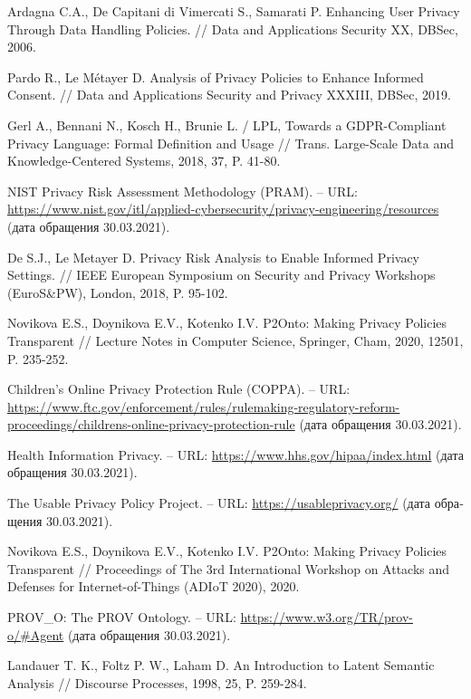 \documentclass[../main]{subfiles}
\begin{document}
\begin{english}
\begin{biblenum}
     Ardagna C.A., De Capitani di Vimercati S., Samarati P. Enhancing User Privacy Through Data Handling Policies. // Data and Applications Security XX, DBSec, 2006. 

     Pardo R., Le Métayer D. Analysis of Privacy Policies to Enhance Informed Consent. // Data and Applications Security and Privacy XXXIII, DBSec, 2019. 

     Gerl A., Bennani N., Kosch H., Brunie L. / LPL, Towards a GDPR-Compliant Privacy Language: Formal Definition and Usage // Trans. Large-Scale Data and Knowledge-Centered Systems, 2018, 37, P. 41-80. 

     NIST Privacy Risk Assessment Methodology (PRAM). -- URL: \url{https://www.nist.gov/itl/applied-cybersecurity/privacy-engineering/resources} (\textrussian{дата обращения} 30.03.2021).

     De S.J., Le Metayer D.  Privacy Risk Analysis to Enable Informed Privacy Settings. // IEEE European Symposium on Security and Privacy Workshops (EuroS\&PW), London, 2018, P. 95-102. 

     Novikova E.S., Doynikova E.V., Kotenko I.V. P2Onto: Making Privacy Policies Transparent // Lecture Notes in Computer Science, Springer, Cham, 2020, 12501, P. 235-252.

     Children's Online Privacy Protection Rule (COPPA). -- URL: \url{https://www.ftc.gov/enforcement/rules/rulemaking-regulatory-reform-proceedings/childrens-online-privacy-protection-rule} (\textrussian{дата обращения} 30.03.2021). 

     Health Information Privacy. -- URL: \url{https://www.hhs.gov/hipaa/index.html} (\textrussian{дата обращения} 30.03.2021).

     The Usable Privacy Policy Project. -- URL: \url{https://usableprivacy.org/} (\textrussian{дата обращения} 30.03.2021).

     Novikova E.S., Doynikova E.V., Kotenko I.V. P2Onto: Making Privacy Policies Transparent // Proceedings of The 3rd International Workshop on Attacks and Defenses for Internet-of-Things (ADIoT 2020), 2020.

     PROV\_O: The PROV Ontology. -- URL: \url{https://www.w3.org/TR/prov-o/#Agent} (\textrussian{дата обращения} 30.03.2021).

     Landauer T. K., Foltz P. W., Laham D. An Introduction to Latent Semantic Analysis // Discourse Processes, 1998, 25, P. 259-284.


\end{biblenum}
\end{english}
\end{document}

